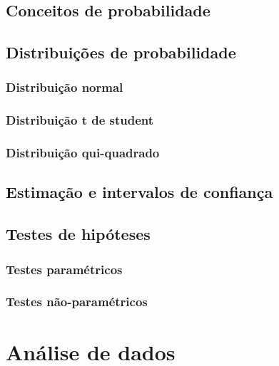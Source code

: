 \documentclass[
]{book}
\begin{document}
\section{Conceitos de probabilidade}\label{conceitos-de-probabilidade}

\section{Distribuições de probabilidade}\label{distribuiuxe7uxf5es-de-probabilidade}

\subsection{Distribuição normal}\label{distribuiuxe7uxe3o-normal}

\subsection{Distribuição t de student}\label{distribuiuxe7uxe3o-t-de-student}

\subsection{Distribuição qui-quadrado}\label{distribuiuxe7uxe3o-qui-quadrado}

\section{Estimação e intervalos de confiança}\label{estimauxe7uxe3o-e-intervalos-de-confianuxe7a}

\section{Testes de hipóteses}\label{testes-de-hipuxf3teses}

\subsection{Testes paramétricos}\label{testes-paramuxe9tricos}

\subsection{Testes não-paramétricos}\label{testes-nuxe3o-paramuxe9tricos}

\chapter{Análise de dados}\label{anuxe1lise-de-dados}
\end{document}
